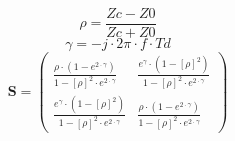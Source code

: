 \[ \rho =  \frac{ Zc-Z0 }{ Zc + Z0 } \]
\[ \gamma =  -j \cdot 2 \pi \cdot f \cdot Td \]
\[ \mathbf{S} = \left(\begin{array}{cc}  \frac{ \rho \cdot \left( 1 -
e^{2 \cdot \gamma }  \right) }{ 1 - \left[ \rho \right]^2 \cdot e^{2
\cdot \gamma }  } &  \frac{ e^{\gamma} \cdot \left( 1 - \left[ \rho
\right] ^2 \right) }{ 1 - \left[ \rho \right]^2 \cdot e^{2 \cdot
\gamma }  }  \\  \frac{ e^{\gamma} \cdot \left( 1 - \left[ \rho
\right] ^2 \right) }{ 1 - \left[ \rho \right]^2 \cdot e^{2 \cdot
\gamma }  }  &  \frac{ \rho \cdot \left( 1 - e^{2 \cdot \gamma }
\right) }{ 1 - \left[ \rho \right]^2 \cdot e^{2 \cdot \gamma }  }
\end{array}\right) \]

